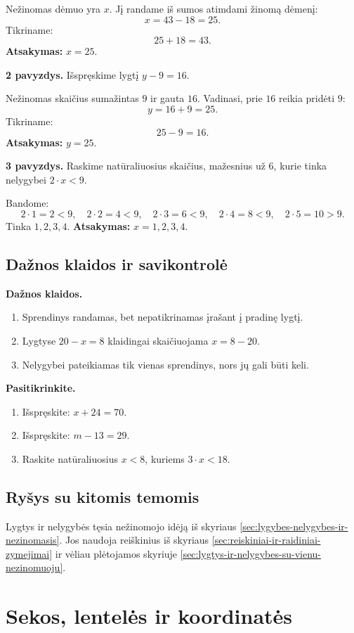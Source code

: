 Nežinomas dėmuo yra \(x\). Jį randame iš sumos atimdami žinomą dėmenį:
\[
x=43-18=25.
\]
Tikriname:
\[
25+18=43.
\]
\textbf{Atsakymas:} \(x=25\).

\textbf{2 pavyzdys.} Išspręskime lygtį \(y-9=16\).

Nežinomas skaičius sumažintas \(9\) ir gauta \(16\). Vadinasi, prie \(16\) reikia pridėti \(9\):
\[
y=16+9=25.
\]
Tikriname:
\[
25-9=16.
\]
\textbf{Atsakymas:} \(y=25\).

\textbf{3 pavyzdys.} Raskime natūraliuosius skaičius, mažesnius už \(6\), kurie tinka nelygybei \(2\cdot x<9\).

Bandome:
\[
2\cdot1=2<9,\quad 2\cdot2=4<9,\quad 2\cdot3=6<9,\quad 2\cdot4=8<9,\quad 2\cdot5=10>9.
\]
Tinka \(1,2,3,4\).
\textbf{Atsakymas:} \(x=1,2,3,4\).

\subsection{Dažnos klaidos ir savikontrolė}

\textbf{Dažnos klaidos.}
\begin{enumerate}[label=\arabic*.]
\item Sprendinys randamas, bet nepatikrinamas įrašant į pradinę lygtį.
\item Lygtyse \(20-x=8\) klaidingai skaičiuojama \(x=8-20\).
\item Nelygybei pateikiamas tik vienas sprendinys, nors jų gali būti keli.
\end{enumerate}

\textbf{Pasitikrinkite.}
\begin{enumerate}[label=\arabic*.]
\item Išspręskite: \(x+24=70\).
\item Išspręskite: \(m-13=29\).
\item Raskite natūraliuosius \(x<8\), kuriems \(3\cdot x<18\).
\end{enumerate}

\subsection{Ryšys su kitomis temomis}

Lygtys ir nelygybės tęsia nežinomojo idėją iš skyriaus \ref{sec:lygybes-nelygybes-ir-nezinomasis}. Jos naudoja reiškinius iš skyriaus \ref{sec:reiskiniai-ir-raidiniai-zymejimai} ir vėliau plėtojamos skyriuje \ref{sec:lygtys-ir-nelygybes-su-vienu-nezinomuoju}.

\section{Sekos, lentelės ir koordinatės}\label{sec:sekos-lenteles-ir-koordinates}

